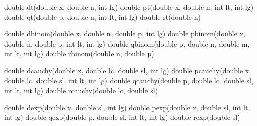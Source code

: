\documentclass[]{book}
\newenvironment{Shaded}{\begin{snugshade}}{\end{snugshade}}
\newcommand{\DataTypeTok}[1]{\textcolor[rgb]{0.13,0.29,0.53}{#1}}
\newcommand{\NormalTok}[1]{#1}
\begin{document}
\begin{Shaded}
\begin{Highlighting}[]
\DataTypeTok{double}\NormalTok{ dt(}\DataTypeTok{double}\NormalTok{ x, }\DataTypeTok{double}\NormalTok{ n, }\DataTypeTok{int}\NormalTok{ lg)           }
\DataTypeTok{double}\NormalTok{ pt(}\DataTypeTok{double}\NormalTok{ x, }\DataTypeTok{double}\NormalTok{ n, }\DataTypeTok{int}\NormalTok{ lt, }\DataTypeTok{int}\NormalTok{ lg)       }
\DataTypeTok{double}\NormalTok{ qt(}\DataTypeTok{double}\NormalTok{ p, }\DataTypeTok{double}\NormalTok{ n, }\DataTypeTok{int}\NormalTok{ lt, }\DataTypeTok{int}\NormalTok{ lg)       }
\DataTypeTok{double}\NormalTok{ rt(}\DataTypeTok{double}\NormalTok{ n)                     }

\DataTypeTok{double}\NormalTok{ dbinom(}\DataTypeTok{double}\NormalTok{ x, }\DataTypeTok{double}\NormalTok{ n, }\DataTypeTok{double}\NormalTok{ p, }\DataTypeTok{int}\NormalTok{ lg)     }
\DataTypeTok{double}\NormalTok{ pbinom(}\DataTypeTok{double}\NormalTok{ x, }\DataTypeTok{double}\NormalTok{ n, }\DataTypeTok{double}\NormalTok{ p, }\DataTypeTok{int}\NormalTok{ lt, }\DataTypeTok{int}\NormalTok{ lg)  }
\DataTypeTok{double}\NormalTok{ qbinom(}\DataTypeTok{double}\NormalTok{ p, }\DataTypeTok{double}\NormalTok{ n, }\DataTypeTok{double}\NormalTok{ m, }\DataTypeTok{int}\NormalTok{ lt, }\DataTypeTok{int}\NormalTok{ lg)  }
\DataTypeTok{double}\NormalTok{ rbinom(}\DataTypeTok{double}\NormalTok{ n, }\DataTypeTok{double}\NormalTok{ p)}

\DataTypeTok{double}\NormalTok{ dcauchy(}\DataTypeTok{double}\NormalTok{ x, }\DataTypeTok{double}\NormalTok{ lc, }\DataTypeTok{double}\NormalTok{ sl, }\DataTypeTok{int}\NormalTok{ lg)      }
\DataTypeTok{double}\NormalTok{ pcauchy(}\DataTypeTok{double}\NormalTok{ x, }\DataTypeTok{double}\NormalTok{ lc, }\DataTypeTok{double}\NormalTok{ sl, }\DataTypeTok{int}\NormalTok{ lt, }\DataTypeTok{int}\NormalTok{ lg)  }
\DataTypeTok{double}\NormalTok{ qcauchy(}\DataTypeTok{double}\NormalTok{ p, }\DataTypeTok{double}\NormalTok{ lc, }\DataTypeTok{double}\NormalTok{ sl, }\DataTypeTok{int}\NormalTok{ lt, }\DataTypeTok{int}\NormalTok{ lg)  }
\DataTypeTok{double}\NormalTok{ rcauchy(}\DataTypeTok{double}\NormalTok{ lc, }\DataTypeTok{double}\NormalTok{ sl)                    }

\DataTypeTok{double}\NormalTok{ dexp(}\DataTypeTok{double}\NormalTok{ x, }\DataTypeTok{double}\NormalTok{ sl, }\DataTypeTok{int}\NormalTok{ lg)        }
\DataTypeTok{double}\NormalTok{ pexp(}\DataTypeTok{double}\NormalTok{ x, }\DataTypeTok{double}\NormalTok{ sl, }\DataTypeTok{int}\NormalTok{ lt, }\DataTypeTok{int}\NormalTok{ lg)    }
\DataTypeTok{double}\NormalTok{ qexp(}\DataTypeTok{double}\NormalTok{ p, }\DataTypeTok{double}\NormalTok{ sl, }\DataTypeTok{int}\NormalTok{ lt, }\DataTypeTok{int}\NormalTok{ lg)    }
\DataTypeTok{double}\NormalTok{ rexp(}\DataTypeTok{double}\NormalTok{ sl)              }


\end{Highlighting}
\end{Shaded}
\end{document}
